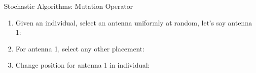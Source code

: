 \documentclass{beamer}
\begin{document}
\begin{frame}[t]{Stochastic Algorithms: Mutation Operator}
    \begin{enumerate}
        \item Given an individual, select an antenna uniformly at random, let's say antenna 1:\par
            \begin{minipage}[t]{\linewidth}
                \centering
            \end{minipage}
        \item For antenna 1, select any other placement:\par
            \begin{minipage}[t]{\linewidth}
                \centering
            \end{minipage}
        \item Change position for antenna 1 in individual:\par
            \begin{minipage}[t]{\linewidth}
                \centering
            \end{minipage}
    \end{enumerate}
\end{frame}
\end{document}
